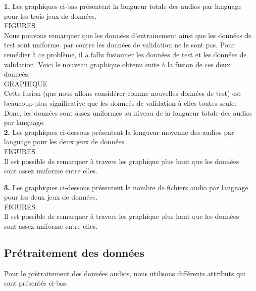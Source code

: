 \documentclass[11pt]{article}
\begin{document}
\textbf{1.} Les graphiques ci-bas présentent la longueur totale des audios par language pour les trois jeux de données.\\

FIGURES\\

Nous pouvons remarquer que les données d'entrainement ainsi que les données de test sont uniforme. par contre les données de validation ne le sont pas. Pour remédier à ce problème, il a fallu fusionner les données de test et les données de validation. Voici le nouveau graphique obtenu suite à la fusion de ces deux donneés:\\

GRAPHIQUE\\

Cette fusion (que nous allons considérer comme nouvelles données de test) est beaucoup plus significative que les donneés de validation à elles toutes seule.\\
Donc, les données sont assez uniformes au niveau de la longueur totale des audios par language.\\

\textbf{2.} Les graphiques ci-dessous présentent la longueur moyenne des audios par language pour les deux jeux de données.\\

FIGURES\\

Il est possible de remarquer à travers les graphique plus haut que les données sont assez uniforme entre elles.

\textbf{3.} Les graphiques ci-dessous présentent le nombre de fichiers audio par language pour les deux jeux de données.\\

FIGURES\\

Il est possible de remarquer à travers les graphique plus haut que les données sont assez uniforme entre elles.


\subsection{Prétraitement des données}
Pour le prétraitement des données audios, nous utilisons différents attributs qui sont présentés ci-bas.
\end{document}

